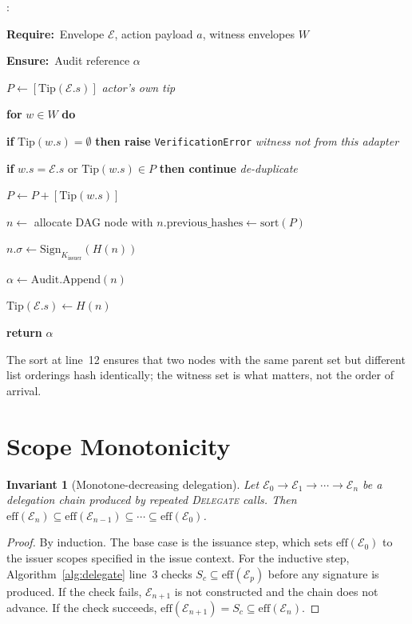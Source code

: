 \documentclass[11pt,a4paper]{article}
\newcommand{\AlgKwd}[1]{\textbf{#1}}
\newcommand{\Require}{\AlgKwd{Require:}~}
\newcommand{\Ensure}{\AlgKwd{Ensure:}~}
\newcommand{\Comment}[1]{\hfill\textit{\small#1}}
\newenvironment{algorithmic}
  {\begin{framed}\small\begin{list}{\arabic{enumi}:}{%
      \usecounter{enumi}\setlength{\itemsep}{0pt}\setlength{\parsep}{0pt}%
      \setlength{\leftmargin}{2.2em}\setlength{\labelwidth}{1.8em}}}
  {\end{list}\end{framed}}
\newtheorem{invariant}{Invariant}
\begin{document}
\begin{algo}
\caption{\textsc{AuditWithWitnesses}($\mathcal{E}, a, W$)}\label{alg:witness}
\begin{algorithmic}
\item \Require Envelope $\mathcal{E}$, action payload $a$, witness envelopes $W$
\item \Ensure Audit reference $\alpha$
\item $P \gets [\mathrm{Tip}(\mathcal{E}.s)]$ \Comment{actor's own tip}
\item \textbf{for} $w \in W$ \textbf{do}
\item \quad \textbf{if} $\mathrm{Tip}(w.s) = \emptyset$ \textbf{then raise} \texttt{VerificationError} \Comment{witness not from this adapter}
\item \quad \textbf{if} $w.s = \mathcal{E}.s$ or $\mathrm{Tip}(w.s) \in P$ \textbf{then continue} \Comment{de-duplicate}
\item \quad $P \gets P + [\mathrm{Tip}(w.s)]$
\item $n \gets$ allocate DAG node with $n.\text{previous\_hashes} \gets \mathrm{sort}(P)$
\item $n.\sigma \gets \mathrm{Sign}_{K_\text{issuer}}(H(n))$
\item $\alpha \gets \mathrm{Audit.Append}(n)$
\item $\mathrm{Tip}(\mathcal{E}.s) \gets H(n)$
\item \textbf{return} $\alpha$
\end{algorithmic}
\end{algo}

The sort at line~12 ensures that two nodes with the same parent set but
different list orderings hash identically; the witness set is what
matters, not the order of arrival.

\section{Scope Monotonicity}\label{sec:monotonicity}

\begin{invariant}[Monotone-decreasing delegation]\label{inv:mono}
Let $\mathcal{E}_0 \to \mathcal{E}_1 \to \cdots \to \mathcal{E}_n$ be a
delegation chain produced by repeated \textsc{Delegate} calls. Then
$\text{eff}(\mathcal{E}_n) \subseteq \text{eff}(\mathcal{E}_{n-1})
\subseteq \cdots \subseteq \text{eff}(\mathcal{E}_0)$.
\end{invariant}

\begin{proof}
By induction. The base case is the issuance step, which sets
$\text{eff}(\mathcal{E}_0)$ to the issuer scopes specified in the issue
context. For the inductive step, Algorithm~\ref{alg:delegate} line~3
checks $S_c \subseteq \text{eff}(\mathcal{E}_p)$ before any signature is
produced. If the check fails, $\mathcal{E}_{n+1}$ is not constructed and
the chain does not advance. If the check succeeds,
$\text{eff}(\mathcal{E}_{n+1}) = S_c \subseteq \text{eff}(\mathcal{E}_n)$.
\end{proof}
\end{document}
